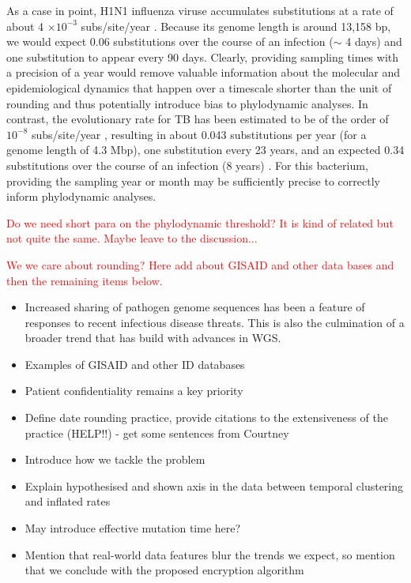 \documentclass{article}
\begin{document}
\begin{spacing}{1.5}
As a case in point, H1N1 influenza viruse accumulates substitutions at a rate of about 4 $\times10^{-3}$ subs/site/year \citep{hedge_2013_real-time}. Because its genome length is around 13,158 bp, we would expect 0.06 substitutions over the course of an infection ($\sim$ 4 days) and one substitution to appear every 90 days. Clearly, providing sampling times with a precision of a year would remove valuable information about the molecular and epidemiological dynamics that happen over a timescale shorter than the unit of rounding and thus potentially introduce bias to phylodynamic analyses. In contrast, the evolutionary rate for TB has been estimated to be of the order of $10^{-8}$ subs/site/year \citep{menardo2019molecular}, resulting in about 0.043 substitutions per year (for a genome length of 4.3 Mbp), one substitution every 23 years, and an expected 0.34 substitutions over the course of an infection (8 years) \citep{kuhnert_tuberculosis_2018}. For this bacterium, providing the sampling year or month may be sufficiently precise to correctly inform phylodynamic analyses.

\textcolor{red}{Do we need short para on the phylodynamic threshold? It is kind of related but not quite the same. Maybe leave to the discussion...}

\textcolor{red}{We we care about rounding? Here add about GISAID and other data bases and then the remaining items below. }


\begin{itemize}
    \item Increased sharing of pathogen genome sequences has been a feature of responses to recent infectious disease threats. This is also the culmination of a broader trend that has build with advances in WGS. 
    \item Examples of GISAID and other ID databases
    \item Patient confidentiality remains a key priority 
    \item Define date rounding practice, provide citations to the extensiveness of the practice (HELP!!) - get some sentences from Courtney
    \item Introduce how we tackle the problem
    \item Explain hypothesised and shown axis in the data between temporal clustering and inflated rates
    \item May introduce effective mutation time here?
    \item Mention that real-world data features blur the trends we expect, so mention that we conclude with the proposed encryption algorithm
\end{itemize}




\end{spacing}
\end{document}
